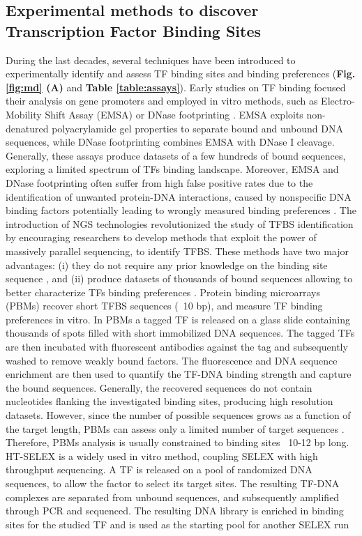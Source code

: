 \documentclass[a4paper, titlepage, openright]{book}
\begin{document}
\subsection{Experimental methods to discover Transcription Factor Binding Sites}
During the last decades, several techniques have been introduced to experimentally identify and assess TF binding sites and binding preferences \citep{jolma2011methods} (\textbf{Fig.\ref{fig:md} (A)} and \textbf{Table \ref{table:assays}}). Early studies on TF binding focused their analysis on gene promoters \citep{stormo2000dna} and employed in vitro methods, such as Electro-Mobility Shift Assay (EMSA) \citep{garner1981gel} or DNase footprinting \citep{galas1978dnaase}. EMSA exploits non-denatured polyacrylamide gel properties to separate bound and unbound DNA sequences, while DNase footprinting combines EMSA with DNase I cleavage. Generally, these assays produce datasets of a few hundreds of bound sequences, exploring a limited spectrum of TFs binding landscape. Moreover, EMSA and DNase footprinting often suffer from high false positive rates due to the identification of unwanted protein-DNA interactions, caused by nonspecific DNA binding factors potentially leading to wrongly measured binding preferences \citep{jolma2011methods}. The introduction of NGS technologies revolutionized the study of TFBS identification by encouraging researchers to develop methods that exploit the power of massively parallel sequencing, to identify TFBS. These methods have two major advantages: (i) they do not require any prior knowledge on the binding site sequence \citep{jolma2011methods,zia2012towards}, and (ii) produce datasets of thousands of bound sequences allowing to better characterize TFs binding preferences \citep{stormo2010determining}. Protein binding microarrays (PBMs) \citep{berger2006compact,berger2009universal} recover short TFBS sequences (~10 bp), and measure TF binding preferences in vitro. In PBMs a tagged TF is released on a glass slide containing thousands of spots filled with short immobilized DNA sequences. The tagged TFs are then incubated with fluorescent antibodies against the tag and subsequently washed to remove weakly bound factors. The fluorescence and DNA sequence enrichment are then used to quantify the TF-DNA binding strength and capture the bound sequences. Generally, the recovered sequences do not contain nucleotides flanking the investigated binding sites, producing high resolution datasets. However, since the number of possible sequences grows as a function of the target length, PBMs can assess only a limited number of target sequences \citep{jolma2011methods,zia2012towards}. Therefore, PBMs analysis is usually constrained to binding sites ~10-12 bp long.  HT-SELEX \citep{jolma2011methods,jolma2010multiplexed} is a widely used in vitro method, coupling SELEX with high throughput sequencing. A TF is released on a pool of randomized DNA sequences, to allow the factor to select its target sites. The resulting TF-DNA complexes are separated from unbound sequences, and subsequently amplified through PCR and sequenced. The resulting DNA library is enriched in binding sites for the studied TF and is used as the starting pool for another SELEX run 
\end{document}
